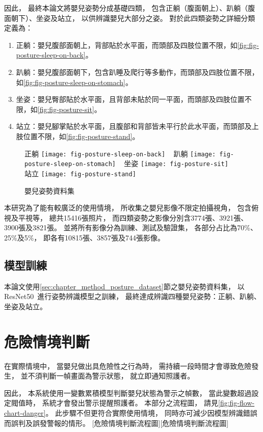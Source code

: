 \documentclass[class=NCU_thesis, crop=false]{standalone}
\begin{document}
因此，
最終本論文將嬰兒姿勢分成基礎四類，
包含正躺（腹面朝上）、趴躺（腹面朝下）、坐姿及站立，
以供辨識嬰兒大部分之姿。
對於此四類姿勢之詳細分類定義為：
\begin{enumerate}
    \item 正躺：嬰兒腹部面朝上，背部貼於水平面，而頭部及四肢位置不限，如\cref{fig:fig-posture-sleep-on-back}。
    \item 趴躺：嬰兒腹部面朝下，包含趴睡及爬行等多動作，而頭部及四肢位置不限，如\cref{fig:fig-posture-sleep-on-stomach}。
    \item 坐姿：嬰兒臀部貼於水平面，且背部未貼於同一平面，而頭部及四肢位置不限，如\cref{fig:fig-posture-sit}。
    \item 站立：嬰兒腳掌貼於水平面，且腹部和背部皆未平行於此水平面，而頭部及上肢位置不限，如\cref{fig:fig-posture-stand}。
\end{enumerate}
\begin{figure}[!hbt]
    \centering
    \subcaptionbox
        {正躺
        \label{fig:fig-posture-sleep-on-back}}
        {\texttt{[image: fig-posture-sleep-on-back]}}
    ~
    \subcaptionbox
        {趴躺
        \label{fig:fig-posture-sleep-on-stomach}}
        {\texttt{[image: fig-posture-sleep-on-stomach]}}
    ~
    \subcaptionbox
        {坐姿
        \label{fig:fig-posture-sit}}
        {\texttt{[image: fig-posture-sit]}}
    ~
    \subcaptionbox
        {站立
        \label{fig:fig-posture-stand}}
        {\texttt{[image: fig-posture-stand]}}
    \caption{嬰兒姿勢資料集}
    \label{fig:fig-face-dataset}
\end{figure}

本研究為了能有較廣泛的使用情境，
所收集之嬰兒影像不限定拍攝視角，
包含俯視及平視等，
總共15416張照片，
而四類姿勢之影像分別含3774張、3921張、3900張及3821張。
並將所有影像分為訓練、測試及驗證集，
各部分占比為70\%、25\%及5\%，
即各有10815張、3857張及744張影像。

\subsection{模型訓練}
本論文使用\ref{sec:chapter_method_posture_dataset}節之嬰兒姿勢資料集，
以ResNet50~\cite{he_deep_2016}進行姿勢辨識模型之訓練，
最終達成辨識四種嬰兒姿勢：正躺、趴躺、坐姿及站立。

\section{危險情境判斷}
\label{sec:chapter_method_danger}
在實際情境中，
當嬰兒做出具危險性之行為時，
需持續一段時間才會導致危險發生，
並不須判斷一幀畫面為警示狀態，
就立即通知照護者。

因此，
本系統使用一變數累積模型判斷嬰兒狀態為警示之幀數，
當此變數超過設定閥值時，
系統才會發出警示提醒照護者。
本部分之流程圖，
請見\cref{fig:fig-flow-chart-danger}。
此步驟不但更符合實際使用情境，
同時亦可減少因模型辨識錯誤而誤判及誤發警報的情形。
[危險情境判斷流程圖][危險情境判斷流程圖]
\end{document}
